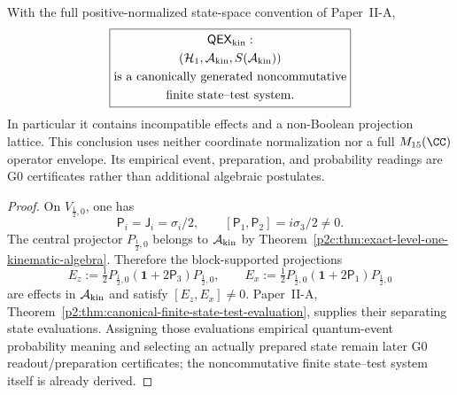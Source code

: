 \documentclass[12pt,a4paper]{article}
\begin{document}
\begin{corollary}
\label{p2c:cor:contained-quantum-kinematic-existence}
With the full positive-normalized state-space convention of Paper~II-A,
\[
 \boxed{\begin{gathered}
 \mathsf{QEX}_{\rm kin}:\\
 (\mathcal H_1,\mathcal A_{\rm kin},S(\mathcal A_{\rm kin}))\\
 \text{is a canonically generated noncommutative}\\
 \text{finite state--test system}.
 \end{gathered}}
\]
In particular it contains incompatible effects and a non-Boolean projection
lattice.  This conclusion uses neither coordinate normalization nor a full
\(M_{15}(\CC)\) operator envelope.  Its empirical event, preparation, and
probability readings are G0 certificates rather than additional algebraic
postulates.
\end{corollary}

\begin{proof}
On \(V_{\frac12,0}\), one has
\[
 \mathsf P_i=\mathsf J_i=\sigma_i/2,
 \qquad
 [\mathsf P_1,\mathsf P_2]=i\sigma_3/2\ne0.
\]
The central projector \(P_{\frac12,0}\) belongs to
\(\mathcal A_{\rm kin}\) by
Theorem~\ref{p2c:thm:exact-level-one-kinematic-algebra}.  Therefore the
block-supported projections
\[
 E_z:=\tfrac12P_{\frac12,0}(\mathbf1+2\mathsf P_3)P_{\frac12,0},
 \qquad
 E_x:=\tfrac12P_{\frac12,0}(\mathbf1+2\mathsf P_1)P_{\frac12,0}
\]
are effects in \(\mathcal A_{\rm kin}\) and satisfy \([E_z,E_x]\ne0\).
Paper~II-A, Theorem~\ref{p2:thm:canonical-finite-state-test-evaluation},
supplies their separating state evaluations.  Assigning those evaluations
empirical quantum-event probability meaning and selecting an actually prepared
state remain later G0 readout/preparation certificates; the noncommutative
finite state--test system itself is already derived.
\end{proof}
\end{document}
